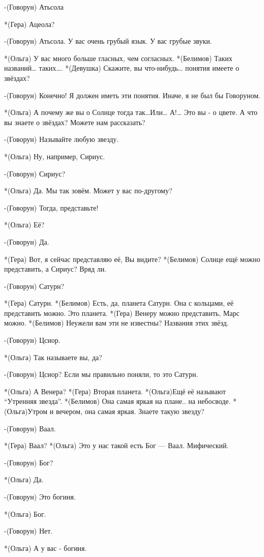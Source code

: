 -(Говорун) Атьсола

*(Гера) Ацеола?

-(Говорун) Атьсола. У вас очень грубый язык. У вас грубые звуки.

*(Ольга) У вас много больше гласных, чем согласных.
*(Белимов) Таких названий… таких….
*(Девушка) Скажите, вы что-нибудь… понятия имеете о звёздах?

-(Говорун) Конечно! Я должен иметь эти понятия. Иначе, я не был бы Говоруном.

*(Ольга) А почему же вы о Солнце тогда так…Или… А!… Это вы - о цвете. А что вы знаете о звёздах? Можете нам рассказать?

-(Говорун) Называйте любую звезду.

*(Ольга) Ну, например, Сириус.

-(Говорун) Сириус?

*(Ольга) Да. Мы так зовём. Может у вас по-другому?

-(Говорун) Тогда, представьте! 

*(Ольга) Её?

-(Говорун) Да.

*(Гера) Вот, я сейчас представляю её, Вы видите?
*(Белимов) Солнце ещё можно представить, а Сириус? Вряд ли.

-(Говорун) Сатурн?

*(Гера) Сатурн.
*(Белимов) Есть, да, планета Сатурн. Она с кольцами, её представить можно. Это планета.
*(Гера) Венеру можно представить, Марс можно.
*(Белимов) Неужели вам эти не известны? Названия этих звёзд.

-(Говорун) Цсиор.

*(Ольга) Так называете вы, да?

-(Говорун) Цсиор? Если мы правильно поняли, то это Сатурн.

*(Ольга) А Венера? 
*(Гера) Вторая планета.
*(Ольга)Ещё её называют “Утренняя звезда”.
*(Белимов) Она самая яркая на плане.. на небосводе.
*(Ольга)Утром и вечером, она самая яркая. Знаете такую звезду?

-(Говорун) Ваал. 

*(Гера) Ваал?
*(Ольга) Это у нас такой есть Бог — Ваал. Мифический.

-(Говорун) Бог?

*(Ольга) Да.

-(Говорун) Это богиня.

*(Ольга) Бог.

-(Говорун) Нет. 

*(Ольга) А у вас - богиня.

